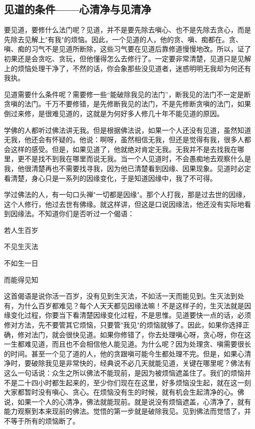 \documentclass{book}
\begin{document}
\subsection{见道的条件——心清净与见清净}

要见道，要修什么法门呢？见道，并不是要先除去嗔心、也不是先除去贪心，而是先除去见解上"有我"的烦恼。因此，一个见道的人，他的贪、嗔、痴都在。贪、嗔、痴的习气不是见道所断除，这些习气要在见道后靠修道慢慢地改。所以，证了初果还是会贪吃、贪玩，但他懂得怎么去修行了。一定要非常清楚，见道只是见解上的烦恼处理干净了，不然的话，你会象那些没见道者，迷惑明明无我却为何还有我执。

见道需要什么条件呢？需要修一些``能破除我见的法门''，断我见的法门不一定是断贪嗔的法门。千万不要修错，是先修断我见的法门，不是先修断贪嗔的法门，如果倒过来修，是很难见道的，这就是为何好多人修几十年不能见道的原因。

学佛的人都听过佛法讲无我。但是根据佛法说，如果一个人还没有见道，虽然知道无我，他还会有怀疑的。他说：啊呀，虽然相信无我，但还是觉得有我，很多人都会这样的感受。但是，如果见道了，他就绝对肯定无我。无我并不是去找我在哪里，更不是找不到我在哪里而说无我。当一个人见道时，不会愚痴地去观察什么是我，他很清楚再也不需要找寻我，因为他已清楚看到因缘、因果现象。见道时必定看清楚，身心只是一系列的因缘变化，于是知道因缘中，我了不可得。

学过佛法的人，有一句口头禅"一切都是因缘"。那个人打我，那是过去世的因缘，这个人修行，他过去世有佛缘。就这样讲，但这是口说因缘法，他还没有实际地看到因缘法。不知道你们是否听过一个偈语：

若人生百岁

不见生灭法

不如生一日

而能得见知

这首偈语是说你活一百岁，没有见到生灭法，不如活一天而能见到。生灭法到处有，为什么百岁都难见？每个人天天都见因缘法嘛！不是这样子的，生灭法就是因缘变化过程，你要当下看清楚因缘变化过程，不是思惟。见道要快一点的话，必须修对方法，先不要管其它烦恼，只要管"我见"的烦恼就够了。因此，如果你选择正确，修对法门，就会很快见道。如果你修错了，你去处理嗔心呀，贪心呀，你在这一生都难见道，而且也不会相信他人能见道。为什么呢？因为处理贪、嗔需要很长的时间。甚至一个见了道的人，他的贪跟嗔可能今生都处理不完。但是，如果心清净时，要破除我见是非常快的，经典说不必几天就能见道，关键在哪里呢？佛法有这么一句话说：众生之所以佛法不能现前，是因为被烦恼遮盖住了。我们的烦恼并不是二十四小时都生起来的，至少你们现在在这里，好多烦恼没生起，就在这一刻大家都暂时没有嗔心、贪心。在烦恼没有生的时候，就有机会生起清净的心。佛说，如果一个人的心清净，佛法就能现前。就是说没有烦恼遮盖，心清净了，就有能力观察到本来现前的佛法。觉悟的第一步就是破除我见。见到佛法而觉悟了，并不等于所有的烦恼断了。
\end{document}
